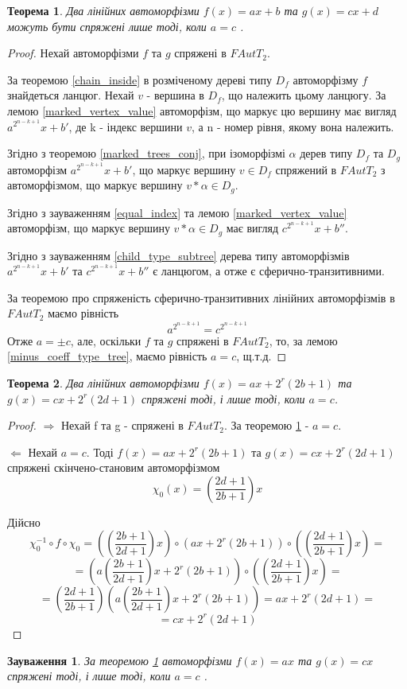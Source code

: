 \documentclass[a4paper,12pt]{article} \usepackage{a4wide}
\numberwithin{equation}{subsection}
\newtheorem{theorem}{Теорема}[subsection]
\newtheorem{remark}{Зауваження}[subsection]
\begin{document}
\begin{theorem}\label{lin_conj_rightarrow}
  Два лінійних автоморфізми $f(x) = ax+b$ та $g(x) = cx+d$ можуть бути
  спряжені лише тоді, коли $a=c$ .
\end{theorem}
\begin{proof}
  Нехай автоморфізми $f$ та $g$ спряжені в $FAutT_2$.

  За теоремою \ref{chain_inside} в розміченому дереві типу $D_f$
  автоморфізму $f$ знайдеться ланцюг. Нехай $v$ - вершина в $D_f$, що
  належить цьому ланцюгу.  За лемою \ref{marked_vertex_value}
  автоморфізм, що маркує цю вершину має вигляд $a^{2^{n-k+1}}x+b'$, де
  k - індекс вершини $v$, а n - номер рівня, якому вона належить.


  Згідно з теоремою \ref{marked_trees_conj}, при ізоморфізмі $\alpha$
  дерев типу $D_f$ та $D_g$ автоморфізм $a^{2^{n-k+1}}x+b'$, що маркує
  вершину $v \in D_f$ спряжений в $FAutT_2$ з автоморфізмом, що маркує
  вершину $v*\alpha \in D_g$.

  Згідно з зауваженням \ref{equal_index} та лемою
  \ref{marked_vertex_value} автоморфізм, що маркує вершину $v*\alpha
  \in D_g$ має вигляд $c^{2^{n-k+1}}x+b''$.

  Згідно з зауваженням \ref{child_type_subtree} дерева типу
  автоморфізмів $a^{2^{n-k+1}}x+b'$ та $c^{2^{n-k+1}}x+b''$ є
  ланцюгом, а отже є сферично-транзитивними.

  За теоремою про спряженість сферично-транзитивних лінійних
  автоморфізмів в $FAutT_2$ маємо рівність $$ a^{2^{n-k+1}} =
  c^{2^{n-k+1}} $$ Отже $a = \pm c$, але, оскільки $f$ та $g$ спряжені
  в $FAutT_2$, то, за лемою \ref{minus_coeff_type_tree}, маємо
  рівність $a = c$, щ.т.д.

\end{proof}


\begin{theorem}\label{power_two_lin_conj}
  Два лінійних автоморфізми $f(x) = ax+2^r(2b+1)$ та $g(x) =
  cx+2^r(2d+1)$ спряжені тоді, і лише тоді, коли $a=c$.
\end{theorem}
\begin{proof}
  $\Rightarrow$ Нехай f та g - спряжені в $FAutT_2$. За теоремою
  \ref{lin_conj_rightarrow} - $a=c$.

  $\Leftarrow$ Нехай $a=c$. Тоді $ f(x) = ax+2^r(2b+1)$ та $ g(x) =
  cx+2^r(2d+1)$ спряжені скінчено-становим автоморфізмом $$\chi_0(x) =
  \left(\frac {2d+1}{2b+1}\right)x$$

  Дійсно
$$ \chi_0^{-1}\circ f \circ \chi_0 = \left(\left(\frac{2b+1}{2d+1}\right)x\right) \circ (ax+2^r(2b+1)) \circ  \left(\left(\frac{2d+1}{2b+1}\right)x\right) = $$
$$=  \left(a\left(\frac{2b+1}{2d+1}\right)x+2^r(2b+1)\right) \circ  \left(\left(\frac{2d+1}{2b+1}\right)x\right) = $$
$$= \left(\frac{2d+1}{2b+1}\right)\left(a\left(\frac{2b+1}{2d+1}\right)x+2^r(2b+1)\right) =  ax+2^r(2d+1) = $$
$$ = cx+2^r(2d+1)  $$
\end{proof}
\begin{remark}
  За теоремою \ref{lin_conj_rightarrow} автоморфізми $f(x) = ax$ та
  $g(x) = cx$ спряжені тоді, і лише тоді, коли $a=c$ .
\end{remark}
\end{document}

